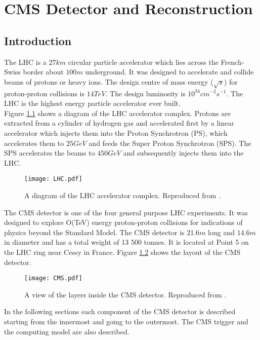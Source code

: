 \chapter{CMS Detector and Reconstruction}

\section{Introduction}

The LHC is a $27\unit{km}$ circular particle accelerator which lies across the
French-Swiss border about $100\unit{m}$ underground. It was designed to accelerate and 
collide beams of protons or heavy ions. The design centre of mass energy
($\sqrt{s}$) for proton-proton collisions is $14\unit{TeV}$. The design 
luminosity is $10^{34}\unit{cm^{-2}s^{-1}}$. The LHC is the highest energy 
particle accelerator ever built. \\

Figure \ref{fig:LHC} shows a diagram of the LHC accelerator complex. Protons are
extracted from a cylinder of hydrogen gas and accelerated first by a linear
accelerator which injects them into the Proton Synchrotron (PS), which 
accelerates them to $25\unit{GeV}$ and feeds the Super Proton Synchrotron 
(SPS). The SPS accelerates the beams to $450\unit{GeV}$ and subsequently injects 
them into the LHC. \\

\begin{figure}
\texttt{[image: LHC.pdf]}
\caption{A diagram of the LHC accelerator complex. Reproduced from
\cite{physics_tdr_1}.}
\label{fig:LHC}
\end{figure}

The CMS detector is one of the four general purpose LHC experiments. It was 
designed to explore O(TeV) energy proton-proton collisions for indications of 
physics beyond the Standard Model. The CMS detector is $21.6\unit{m}$ long and
$14.6\unit{m}$ in diameter and has a total weight of 13 500 tonnes. It is 
located at Point 5 on the LHC ring near Cessy in France. Figure \ref{fig:CMS} 
shows the layout of the CMS detector. \\

\begin{figure}
\texttt{[image: CMS.pdf]}
\caption{A view of the layers inside the CMS detector. Reproduced from
\cite{physics_tdr_1}.}
\label{fig:CMS}
\end{figure}

In the following sections each component of the CMS detector is described 
starting from the innermost and going to the outermost. The CMS trigger and the
computing model are also described. 

